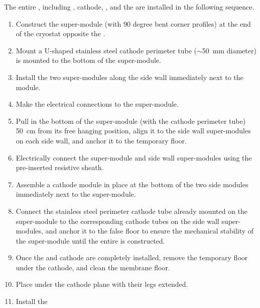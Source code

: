The entire , including , cathode, , and the  are installed in the following sequence.
\begin{enumerate}
    \item Construct the \endwall super-module (with \num{90} degree bent corner profiles) at the end of the cryostat opposite the .
    \item Mount  a U-shaped stainless steel cathode \endwall perimeter tube ($\sim$\SI{50}{\mm} diameter) is mounted to the bottom of the \endwall super-module.
    \item Install %
    the two super-modules along the side wall immediately next to the \endwall module.  
    \item %
    Make the electrical connections to the \endwall super-module.
    \item %
    Pull in the bottom of the \endwall super-module (with the cathode perimeter tube) %
    \SI{50}{\cm} from its free hanging position, align it to the side wall super-modules on each side wall, and anchor it to the temporary floor. 
    \item Electrically connect the \endwall super-module and side wall super-modules %
    using the pre-inserted resistive sheath.
    \item Assemble a cathode module %
    in place at the bottom of the two side  modules immediately next to the \endwall super-module.
    \item Connect the stainless steel perimeter cathode tube already mounted on the \endwall super-module %
    to the corresponding cathode tubes on the side wall super-modules, and anchor it to the false floor to ensure the mechanical stability of the \endwall super-module until the entire  is constructed.
    \item Once the  and cathode are completely installed, remove the temporary floor under the %
    cathode, %
    and clean the membrane floor. %
    \item Place  %
    under the cathode plane with their legs extended.
    \item Install the  %

\end{enumerate}
